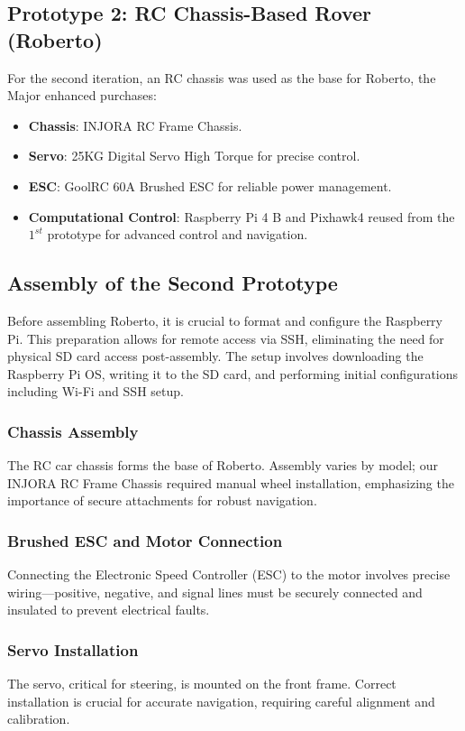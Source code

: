 \documentclass{scrarticle}
\begin{document}
\subsection{Prototype 2: RC Chassis-Based Rover (Roberto)}
For the second iteration, an RC chassis was used as the base for Roberto, the Major enhanced purchases:

\begin{itemize}
    \item \textbf{Chassis}: INJORA RC Frame Chassis. 
    \item \textbf{Servo}: 25KG Digital Servo High Torque for precise control. 
    \item \textbf{ESC}: GoolRC 60A Brushed ESC for reliable power management. 
    \item \textbf{Computational Control}: Raspberry Pi 4 B and Pixhawk4 reused from the $1^{st}$ prototype for advanced control and navigation. 
\end{itemize}

\subsection{Assembly of the Second Prototype}
Before assembling Roberto, it is crucial to format and configure the Raspberry Pi. This preparation allows for remote access via SSH, eliminating the need for physical SD card access post-assembly. The setup involves downloading the Raspberry Pi OS, writing it to the SD card, and performing initial configurations including Wi-Fi and SSH setup.

\subsubsection{Chassis Assembly}
The RC car chassis forms the base of Roberto. Assembly varies by model; our INJORA RC Frame Chassis required manual wheel installation, emphasizing the importance of secure attachments for robust navigation.

\subsubsection{Brushed ESC and Motor Connection}
Connecting the Electronic Speed Controller (ESC) to the motor involves precise wiring—positive, negative, and signal lines must be securely connected and insulated to prevent electrical faults.

\subsubsection{Servo Installation}
The servo, critical for steering, is mounted on the front frame. Correct installation is crucial for accurate navigation, requiring careful alignment and calibration.
\end{document}
